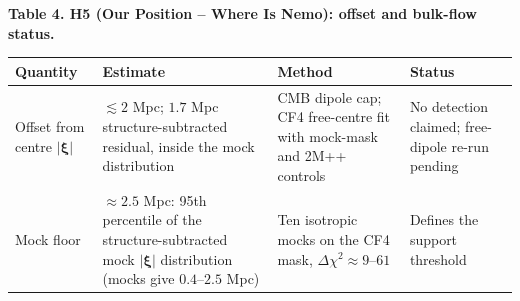 \documentclass[
  11pt,
]{article}
\begin{document}
\textbf{Table 4. H5 (Our Position -- Where Is Nemo): offset and
bulk-flow status.}

\begin{longtable}[]{@{}llll@{}}
\toprule
\begin{minipage}[b]{0.22\columnwidth}\raggedright
Quantity\strut
\end{minipage} & \begin{minipage}[b]{0.22\columnwidth}\raggedright
Estimate\strut
\end{minipage} & \begin{minipage}[b]{0.22\columnwidth}\raggedright
Method\strut
\end{minipage} & \begin{minipage}[b]{0.22\columnwidth}\raggedright
Status\strut
\end{minipage}\tabularnewline
\midrule
\endhead
\begin{minipage}[t]{0.22\columnwidth}\raggedright
Offset from centre \(|\boldsymbol{\xi}|\)\strut
\end{minipage} & \begin{minipage}[t]{0.22\columnwidth}\raggedright
\(\lesssim 2\) Mpc; \(1.7\) Mpc structure-subtracted residual, inside
the mock distribution\strut
\end{minipage} & \begin{minipage}[t]{0.22\columnwidth}\raggedright
CMB dipole cap; CF4 free-centre fit with mock-mask and 2M++
controls\strut
\end{minipage} & \begin{minipage}[t]{0.22\columnwidth}\raggedright
No detection claimed; free-dipole re-run pending\strut
\end{minipage}\tabularnewline
\begin{minipage}[t]{0.22\columnwidth}\raggedright
Mock floor\strut
\end{minipage} & \begin{minipage}[t]{0.22\columnwidth}\raggedright
\(\approx 2.5\) Mpc: 95th percentile of the structure-subtracted mock
\(|\boldsymbol{\xi}|\) distribution (mocks give \(0.4\)--\(2.5\)
Mpc)\strut
\end{minipage} & \begin{minipage}[t]{0.22\columnwidth}\raggedright
Ten isotropic mocks on the CF4 mask,
\(\Delta\chi^2 \approx 9\)--\(61\)\strut
\end{minipage} & \begin{minipage}[t]{0.22\columnwidth}\raggedright
Defines the support threshold\strut
\end{minipage}\tabularnewline

\end{longtable}
\end{document}
